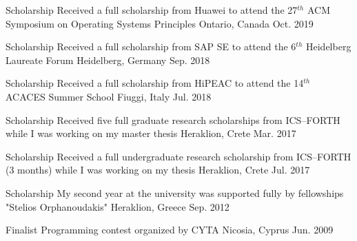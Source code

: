 

\begin{cvhonors}

  \cvhonor
    {Scholarship} %
    {Received a full scholarship from Huawei to attend the 27$^{th}$
    ACM Symposium on Operating Systems Principles} %
    {Ontario, Canada} %
    {Oct. 2019} %

  \cvhonor
    {Scholarship} %
    {Received a full scholarship from SAP SE to attend the 6$^{th}$
    Heidelberg Laureate Forum} %
    {Heidelberg, Germany} %
    {Sep. 2018} %

  \cvhonor
    {Scholarship} %
    {Received a full scholarship from HiPEAC to attend the 14$^{th}$
    ACACES Summer School} %
    {Fiuggi, Italy} %
    {Jul. 2018} %

  \cvhonor
    {Scholarship} %
    {Received five full graduate research scholarships from ICS--FORTH
     while I was working on my master thesis} %
    {Heraklion, Crete} %
    {Mar. 2017} %

  \cvhonor
    {Scholarship} %
    {Received a full undergraduate research scholarship from
    ICS--FORTH (3 months) while I was working on my thesis} %
    {Heraklion, Crete} %
    {Jul. 2017} %
  
  \cvhonor
    {Scholarship} %
    {My second year at the university was supported fully by
          fellowships "Stelios Orphanoudakis"} %
    {Heraklion, Greece} %
    {Sep. 2012} %

  \cvhonor
    {Finalist} %
    {Programming contest organized by CYTA} %
    {Nicosia, Cyprus} %
    {Jun. 2009} %

\end{cvhonors}
